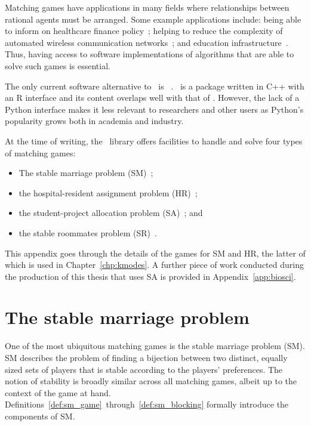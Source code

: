 Matching games have applications in many fields where relationships between
rational agents must be arranged. Some example applications include: being able
to inform on healthcare finance policy~\cite{Agarwal2017}; helping to reduce the
complexity of automated wireless communication networks~\cite{Bayat2016}; and
education infrastructure~\cite{Chiarandini2019}. Thus, having access to software
implementations of algorithms that are able to solve such games is essential.

The only current software alternative to \matching\ is
\matchingr~\cite{Tilly2018}.  \matchingr\ is a package written in C++ with an R
interface and its content overlaps well with that of \matching. However, the
lack of a Python interface makes it less relevant to researchers and other users
as Python's popularity grows both in academia and industry.

At the time of writing, the \matching\ library offers facilities to handle and
solve four types of matching games:

\begin{itemize}
    \item The stable marriage problem (SM)~\cite{Gale1962};
    \item the hospital-resident assignment problem
        (HR)~\cite{Gale1962,Roth1984};
    \item the student-project allocation problem (SA)~\cite{Abraham2007}; and
    \item the stable roommates problem (SR)~\cite{Irving1985}.
\end{itemize}

This appendix goes through the details of the games for SM and HR, the latter
of which is used in Chapter~\ref{chp:kmodes}. A further piece of work conducted
during the production of this thesis that uses SA is provided in
Appendix~\ref{app:biosci}.  %

\section{The stable marriage problem}

One of the most ubiquitous matching games is the stable marriage problem (SM).
SM describes the problem of finding a bijection between two distinct, equally
sized sets of players that is stable according to the players' preferences. The
notion of stability is broadly similar across all matching games, albeit up to
the context of the game at hand.
Definitions~\ref{def:sm_game}~through~\ref{def:sm_blocking} formally introduce
the components of SM.

